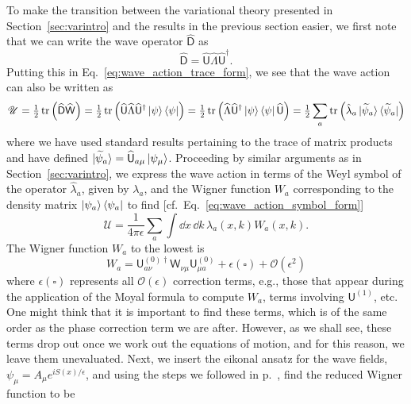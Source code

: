 To make the transition between the variational theory presented in Section~\ref{sec:varintro} and the results in the previous section easier, we first note that we can write the wave operator $\widehat{\mathsf{D}}$ as
%
\begin{equation}
  \widehat{\mathsf{D}} = \widehat{\mathsf{U}}\widehat{\Lambda}\widehat{\mathsf{U}}^{\dagger}.
\end{equation}
%
Putting this in Eq.~\eqref{eq:wave_action_trace_form}, we see that the wave action can also be written as
%
\begin{equation}
  \mathscr{U} = \tfrac{1}{2}\operatorname{tr}\left(\widehat{\mathsf{D}}\widehat{\mathsf{W}}\right) = \tfrac{1}{2}\operatorname{tr}\left(\widehat{\mathsf{U}}\widehat{\Lambda}\widehat{\mathsf{U}}^{\dagger}\mathinner{\lvert{\psi}\rangle}\mathinner{\langle{\psi}\rvert}\right) = \tfrac{1}{2}\operatorname{tr}\left(\widehat{\Lambda}\widehat{\mathsf{U}}^{\dagger}\mathinner{\lvert{\psi}\rangle}\mathinner{\langle{\psi}\rvert}\widehat{\mathsf{U}}\right)
  = \tfrac{1}{2}\sum_{a}\operatorname{tr}\left( \hat{\lambda}_{a}\mathinner{\lvert{\widetilde{\psi}_{a}}\rangle}\mathinner{\langle{\widetilde{\psi}_{a}}\rvert}\right)
\end{equation}
%
where we have used standard results pertaining to the trace of matrix products and have defined $\mathinner{\lvert{\widetilde{\psi}_{a}}\rangle} = \widehat{\mathsf{U}}_{a\mu}\mathinner{\lvert{\psi_{\mu}}\rangle}$.
Proceeding by similar arguments as in Section~\ref{sec:varintro}, we express the wave action in terms of the Weyl symbol of the operator $\hat{\lambda}_{a}$, given by $\lambda_{a}$,  and the Wigner function $W_{a}$ corresponding to the density matrix $\mathinner{\lvert{\psi_{a}}\rangle}\mathinner{\langle{\psi_{a}}\rvert}$ to find [cf.~Eq.~\eqref{eq:wave_action_symbol_form}]
%
\begin{equation}
  \mathscr{U} = \frac{1}{4\pi\epsilon}\sum_{a}\int \dd{x}\,\dd{k}\, \lambda_{a}(x, k) W_{a}(x, k).
\end{equation}
%
The Wigner function $W_{a}$ to the lowest is
%
\begin{equation}
  W_{a} = \mathsf{U}^{(0)\dagger}_{a\nu}\mathsf{W}_{\nu\mu}\mathsf{U}^{(0)}_{\mu a} + \epsilon(\square) + \mathcal{O}(\epsilon^{2})
\end{equation}
%
where $\epsilon(\square)$ represents all $\mathcal{O}(\epsilon)$ correction terms, e.g., those that appear during the application of the Moyal formula to compute $W_{a}$, terms involving $\mathsf{U}^{(1)}$, etc.
One might think that it is important to find these terms, which is of the same order as the phase correction term we are after.
However, as we shall see, these terms drop out once we work out the equations of motion, and for this reason, we leave them unevaluated.
Next, we insert the eikonal ansatz for the wave fields, $\psi_{\mu} = A_{\mu}e^{iS(x)/\epsilon}$, and using the steps we followed in p.~\pageref{page:redaction}, find the reduced Wigner function to be
